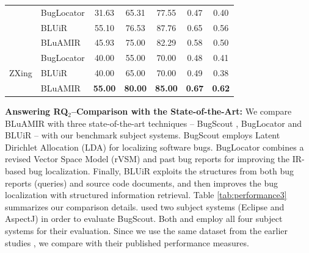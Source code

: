 \documentclass[conference]{IEEEtran}
\begin{document}
\begin{table}[!tb]
{\begin{tabular}{l|l|c|c|c|c|c}
			       & BugLocator & 31.63 & 65.31 & 77.55 & 0.47 & 0.40 \\  \cline{2-7} 
			       & BLUiR & 55.10 & 76.53 & 87.76 & 0.65  & 0.56 \\  \cline{2-7} &BLuAMIR                                                                     & 45.93                                               & 75.00                                              & 82.29                                             &   0.58  &   0.50  \\ \hline \hline
			\multirow{4}{*}{ZXing}                  
			
			
			 & BugLocator & 40.00 & 55.00 & 70.00 & 0.48 & 0.41 \\  \cline{2-7}  
			 & BLUiR & 40.00 & 65.00 & 70.00 & 0.49  & 0.38 \\  \cline{2-7}
			  &BLuAMIR                                                                  & \textbf{55.00}                                            & \textbf{80.00}                                           & \textbf{85.00}                                             &   \textbf{0.67}  &  \textbf{0.62}   \\ \hline
			
			
			
			
	\end{tabular}
	
}
\vspace{-.5cm}
	\centering
\end{table}
\textbf{Answering RQ$_2$--Comparison with the State-of-the-Art:}
We compare BLuAMIR with three state-of-the-art techniques -- BugScout \cite{Nguyen}, BugLocator \cite{Jian} and BLUiR \cite{Saha} -- with our benchmark subject systems. 
BugScout employs Latent Dirichlet Allocation (LDA) for localizing software bugs. BugLocator combines a revised Vector Space Model (rVSM) and past bug reports for improving the IR-based bug localization. Finally, BLUiR exploits the structures from both bug reports (queries) and source code documents, and then improves the bug localization with structured information retrieval.    
Table \ref{tab:performance3} summarizes our comparison details.
\citet{Nguyen} used two subject systems (Eclipse and AspectJ) in order to evaluate BugScout.
Both \citet{Saha} and \citet{Jian} employ all four subject systems for their evaluation. Since we use the same dataset from the earlier studies \cite{Saha,Jian}, we compare with their published performance measures. 
\end{document}
